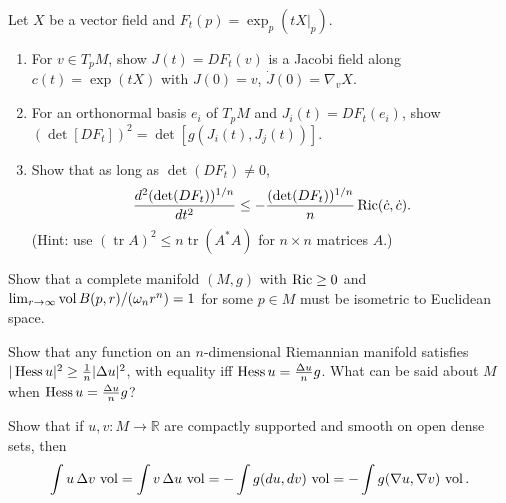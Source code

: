 \begin{remark}
  \label{rem:pet-ch7-ex-9}

  Let $X$ be a vector field and $F_t(p)=\exp_p(tX|_p)$.
  \begin{enumerate}
    \item[(1)] For $v\in T_pM$, show $J(t)=DF_t(v)$ is a Jacobi field along
      $c(t)=\exp(tX)$ with $J(0)=v$, $\dot J(0)=\nabla_vX$.
    \item[(2)] For an orthonormal basis $e_i$ of $T_pM$ and $J_i(t)=DF_t(e_i)$,
      show $(\det[DF_t])^2=\det[g(J_i(t),J_j(t))]$.
    \item[(3)] Show that as long as $\det(DF_t)\ne0$,
      \[
        \frac{d^2(\det(DF_t))^{1/n}}{dt^2}
        \le-\frac{(\det(DF_t))^{1/n}}{n}\operatorname{Ric}(\dot c,\dot c).
      \]
      (Hint: use $(\operatorname{tr}A)^2\le n\operatorname{tr}(A^*A)$ for
      $n\times n$ matrices $A$.)
  \end{enumerate}
\end{remark}

\begin{remark}
  \label{rem:pet-ch7-ex-10}

  Show that a complete manifold $(M,g)$ with $\operatorname{Ric}\ge0$ and
  $\lim_{r\to\infty}\operatorname{vol} B(p,r)/(\omega_nr^n)=1$ for some $p\in M$ must be
  isometric to Euclidean space.
\end{remark}

\begin{remark}
  \label{rem:pet-ch7-ex-11}

  Show that any function on an $n$-dimensional Riemannian manifold satisfies
  $|\operatorname{Hess} u|^2\ge\tfrac1n|\Delta u|^2$, with equality iff
  $\operatorname{Hess} u=\tfrac{\Delta u}{n}g$. What can be said about $M$ when
  $\operatorname{Hess} u=\tfrac{\Delta u}{n}g$?
\end{remark}

\begin{remark}
  \label{rem:pet-ch7-ex-12}

  Show that if $u,v:M\to\mathbb{R}$ are compactly supported and smooth on open dense
  sets, then
  \[
    \int u\,\Delta v\,\operatorname{vol}=\int v\,\Delta u\,\operatorname{vol}
    =-\int g(du,dv)\,\operatorname{vol}=-\int g(\nabla u,\nabla v)\,\operatorname{vol}.
  \]
\end{remark}

